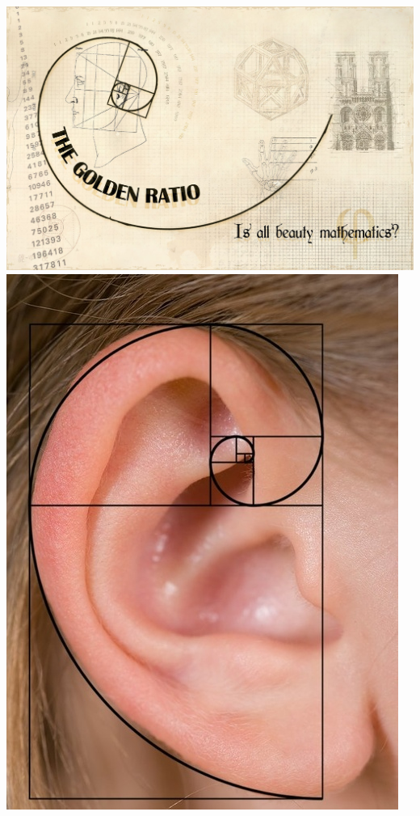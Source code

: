 \documentclass[a4paper,10pt,notitlepage]{report}
\begin{document}
\begin{flushright}
\includegraphics[width=\textwidth, angle=70, scale=0.5]{thegoldenratio} \includegraphics[scale=0.3, angle=45]{naturespiral}
\end{flushright}
\end{document}
